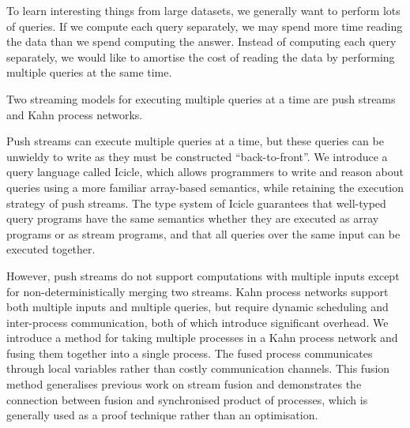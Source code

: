 To learn interesting things from large datasets, we generally want to perform lots of queries.
If we compute each query separately, we may spend more time reading the data than we spend computing the answer.
Instead of computing each query separately, we would like to amortise the cost of reading the data by performing multiple queries at the same time.

Two streaming models for executing multiple queries at a time are push streams and Kahn process networks.

Push streams can execute multiple queries at a time, but these queries can be unwieldy to write as they must be constructed ``back-to-front''.
We introduce a query language called Icicle, which allows programmers to write and reason about queries using a more familiar array-based semantics, while retaining the execution strategy of push streams.
The type system of Icicle guarantees that well-typed query programs have the same semantics whether they are executed as array programs or as stream programs, and that all queries over the same input can be executed together.

However, push streams do not support computations with multiple inputs except for non-deterministically merging two streams.
Kahn process networks support both multiple inputs and multiple queries, but require dynamic scheduling and inter-process communication, both of which introduce significant overhead.
We introduce a method for taking multiple processes in a Kahn process network and fusing them together into a single process.
The fused process communicates through local variables rather than costly communication channels.
This fusion method generalises previous work on stream fusion and demonstrates the connection between fusion and synchronised product of processes, which is generally used as a proof technique rather than an optimisation.


